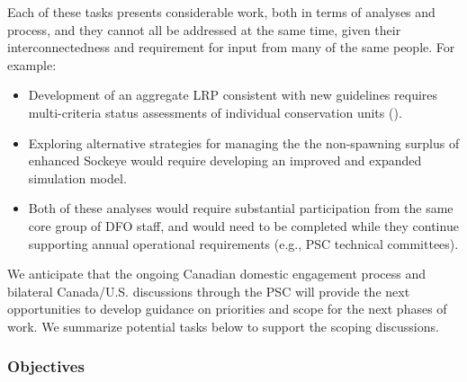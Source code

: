 \documentclass[french,11pt]{book}
\begin{document}
Each of these tasks presents considerable work, both in terms of analyses and process, and they cannot all be addressed at the same time, given their interconnectedness and requirement for input from many of the same people. For example:
\begin{itemize}

\item
  Development of an aggregate LRP consistent with new guidelines requires multi-criteria status assessments of individual conservation units ().
\item
  Exploring alternative strategies for managing the the non-spawning surplus of enhanced Sockeye would require developing an improved and expanded simulation model.
\item
  Both of these analyses would require substantial participation from the same core group of DFO staff, and would need to be completed while they continue supporting annual operational requirements (e.g., PSC technical committees).
\end{itemize}
We anticipate that the ongoing Canadian domestic engagement process and bilateral Canada/U.S. discussions through the PSC will provide the next opportunities to develop guidance on priorities and scope for the next phases of work. We summarize potential tasks below to support the scoping discussions.

\subsubsection{Objectives}\label{objectives}
\end{document}
